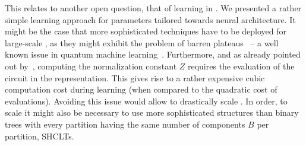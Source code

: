 This relates to another open question,  that of learning in \pocs. We presented a rather simple learning approach for parameters tailored towards neural architecture. It might be the case that more sophisticated techniques have to be deployed for large-scale \pocs, as they might exhibit the problem of barren plateaus~\citep{ragone2023unified} -- a well known issue in quantum machine learning~\citep{biamonte2017quantum,huggins2019towards}.
Furthermore, and as already pointed out by~\citet{loconte2024subtractive}, computing the normalization constant $Z$ requires the evaluation of the circuit in the \poc representation. This gives rise to a rather expensive cubic computation cost during learning (when compared to the quadratic cost of \pvc evaluations). Avoiding this issue would allow to drastically scale \pvcs. In order, to scale \pvcs it might also be necessary to use more sophisticated structures than binary trees with every partition having the same number of components $B$ per partition, \cf SHCLTs.



















